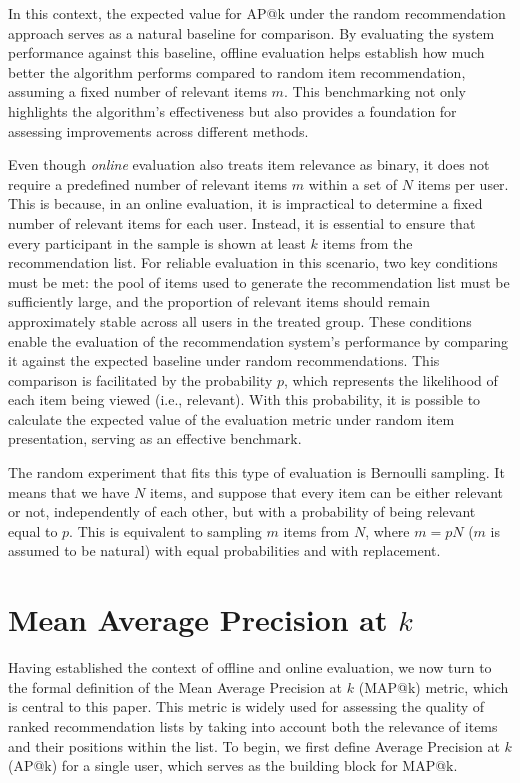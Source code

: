\documentclass{tpms-l}
\theoremstyle{definition}
\theoremstyle{remark}
\numberwithin{equation}{section}
\begin{document}
In this context, the expected value for AP@k under the random recommendation approach serves as a natural baseline for comparison. By evaluating the system performance against this baseline, offline evaluation helps establish how much better the algorithm performs compared to random item recommendation, assuming a fixed number of relevant items $m$. This benchmarking not only highlights the algorithm’s effectiveness but also provides a foundation for assessing improvements across different methods.


Even though \textit{online} evaluation also treats item relevance as binary, it does not require a predefined number of relevant items $m$ within a set of $N$ items per user. This is because, in an online evaluation, it is impractical to determine a fixed number of relevant items for each user. Instead, it is essential to ensure that every participant in the sample is shown at least $k$ items from the recommendation list. For reliable evaluation in this scenario, two key conditions must be met: the pool of items used to generate the recommendation list must be sufficiently large, and the proportion of relevant items should remain approximately stable across all users in the treated group. These conditions enable the evaluation of the recommendation system's performance by comparing it against the expected baseline under random recommendations. This comparison is facilitated by the probability $p$, which represents the likelihood of each item being viewed (i.e., relevant). With this probability, it is possible to calculate the expected value of the evaluation metric under random item presentation, serving as an effective benchmark.

The random experiment that fits this type of evaluation is Bernoulli sampling. It means that we have $N$ items, and suppose that every item can be either relevant or not, independently of each other, but with a probability of being relevant equal to $p$. This is equivalent to sampling $m$ items from $N$, where $m=pN$ ($m$ is assumed to be natural) with equal probabilities and with replacement.  



\section{Mean Average Precision at $k$}\label{sec2}
Having established the context of offline and online evaluation, we now turn to the formal definition of the Mean Average Precision at $k$ (MAP@k) metric, which is central to this paper. This metric is widely used for assessing the quality of ranked recommendation lists by taking into account both the relevance of items and their positions within the list. To begin, we first define Average Precision at $k$ (AP@k) for a single user, which serves as the building block for MAP@k.
\end{document}
